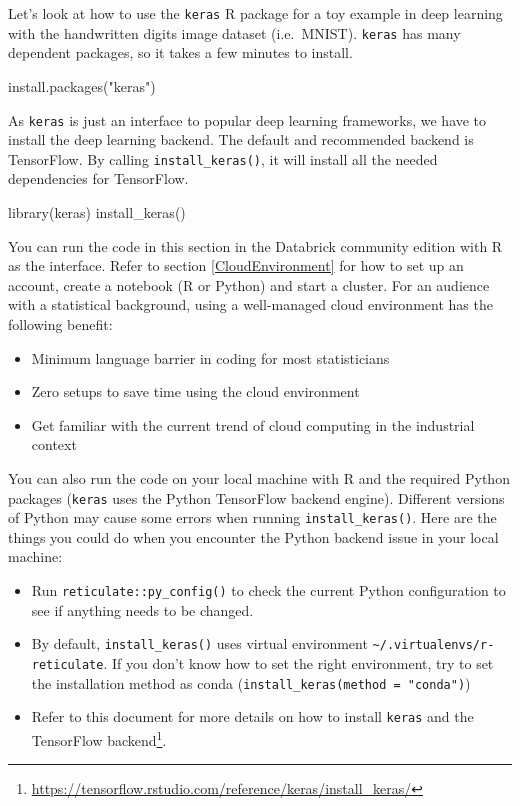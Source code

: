 \documentclass[
  12pt,
]{krantz}
\makeatletter
\newenvironment{Shaded}{\begin{snugshade}}{\end{snugshade}}
\newcommand{\FunctionTok}[1]{\textcolor[rgb]{0,0,0}{#1}}
\newcommand{\NormalTok}[1]{#1}
\newcommand{\StringTok}[1]{\textcolor[rgb]{0.5,0.5,0.5}{#1}}
\providecommand{\tightlist}{%
  \setlength{\itemsep}{0pt}\setlength{\parskip}{0pt}}
\renewcommand{\href}[2]{#2\footnote{\url{#1}}}
\newenvironment{kframe}{%
\medskip{}
\setlength{\fboxsep}{.8em}
 \def\at@end@of@kframe{}%
 \ifinner\ifhmode%
  \def\at@end@of@kframe{\end{minipage}}%
  \begin{minipage}{\columnwidth}%
 \fi\fi%
 \def\FrameCommand##1{\hskip\@totalleftmargin \hskip-\fboxsep
 \colorbox{shadecolor}{##1}\hskip-\fboxsep
     \hskip-\linewidth \hskip-\@totalleftmargin \hskip\columnwidth}%
 \MakeFramed {\advance\hsize-\width
   \@totalleftmargin\z@ \linewidth\hsize
   \@setminipage}}%
 {\par\unskip\endMakeFramed%
 \at@end@of@kframe}
\renewenvironment{Shaded}{\begin{kframe}}{\end{kframe}}
\makeatother
\begin{document}
Let's look at how to use the \texttt{keras} R package for a toy example in deep learning with the handwritten digits image dataset (i.e.~MNIST). \texttt{keras} has many dependent packages, so it takes a few minutes to install.

\begin{Shaded}
\begin{Highlighting}[]
\FunctionTok{install.packages}\NormalTok{(}\StringTok{"keras"}\NormalTok{)}
\end{Highlighting}
\end{Shaded}

As \texttt{keras} is just an interface to popular deep learning frameworks, we have to install the deep learning backend. The default and recommended backend is TensorFlow. By calling \texttt{install\_keras()}, it will install all the needed dependencies for TensorFlow.

\begin{Shaded}
\begin{Highlighting}[]
\FunctionTok{library}\NormalTok{(keras)}
\FunctionTok{install\_keras}\NormalTok{()}
\end{Highlighting}
\end{Shaded}

You can run the code in this section in the Databrick community edition with R as the interface. Refer to section \ref{CloudEnvironment} for how to set up an account, create a notebook (R or Python) and start a cluster. For an audience with a statistical background, using a well-managed cloud environment has the following benefit:

\begin{itemize}
\tightlist
\item
  Minimum language barrier in coding for most statisticians
\item
  Zero setups to save time using the cloud environment
\item
  Get familiar with the current trend of cloud computing in the industrial context
\end{itemize}

You can also run the code on your local machine with R and the required Python packages (\texttt{keras} uses the Python TensorFlow backend engine). Different versions of Python may cause some errors when running \texttt{install\_keras()}. Here are the things you could do when you encounter the Python backend issue in your local machine:

\begin{itemize}
\tightlist
\item
  Run \texttt{reticulate::py\_config()} to check the current Python configuration to see if anything needs to be changed.
\item
  By default, \texttt{install\_keras()} uses virtual environment \texttt{\textasciitilde{}/.virtualenvs/r-reticulate}. If you don't know how to set the right environment, try to set the installation method as conda (\texttt{install\_keras(method\ =\ "conda")})
\item
  Refer to this document for more details on how to \href{https://tensorflow.rstudio.com/reference/keras/install_keras/}{install \texttt{keras} and the TensorFlow backend}.
\end{itemize}
\end{document}
